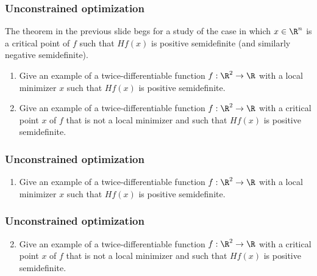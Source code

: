 \documentclass{beamer}
\begin{document}
\begin{frame}[t]
\frametitle{Unconstrained optimization}
The theorem in the previous slide begs for a study of the case in which $x \in \R^n$ is a critical point of $f$ such that $Hf (x)$ is positive semidefinite (and similarly negative semidefinite).
\begin{enumerate}
\item Give an example of a twice-differentiable function $f : \R^2 \rightarrow \R$ with a local minimizer $x$ such that $Hf(x)$ is positive semidefinite.
\item Give an example of a twice-differentiable function $f : \R^2 \rightarrow \R$ with a critical point $x$ of $f$ that is not a local minimizer and such that $Hf(x)$ is positive semidefinite.
\end{enumerate}
\end{frame}

\begin{frame}[t]
\frametitle{Unconstrained optimization}
\begin{enumerate}
\setcounter{enumi}{0}
\item Give an example of a twice-differentiable function $f : \R^2 \rightarrow \R$ with a local minimizer $x$ such that $Hf(x)$ is positive semidefinite.
\end{enumerate}
\end{frame}

\begin{frame}[t]
\frametitle{Unconstrained optimization}
\begin{enumerate}
\setcounter{enumi}{1}
\item Give an example of a twice-differentiable function $f : \R^2 \rightarrow \R$ with a critical point $x$ of $f$ that is not a local minimizer and such that $Hf(x)$ is positive semidefinite.
\pause
\end{enumerate}
\end{frame}
\end{document}
